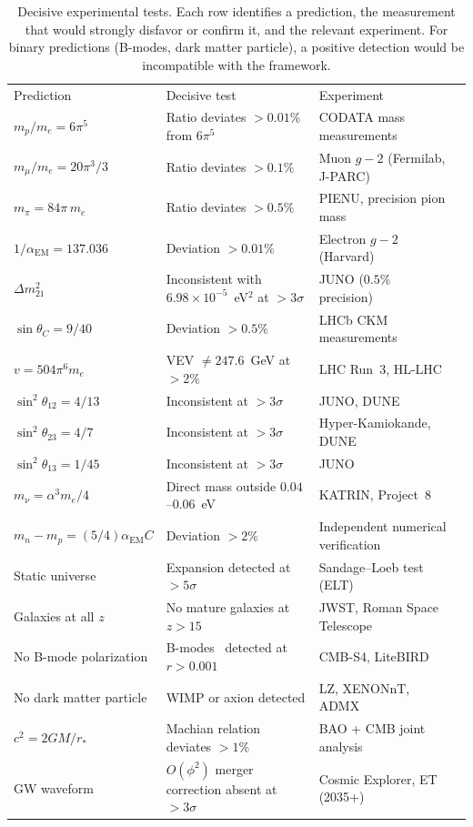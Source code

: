 \documentclass[aps,prd,twocolumn,superscriptaddress,nofootinbib,longbibliography]{revtex4-2}
\newcommand{\rstar}{r_{*}}
\newcommand{\aEM}{\alpha_{\mathrm{EM}}}
\begin{document}
\begin{table}[t]
\caption{\label{tab:falsify}%
Decisive experimental tests.  Each row identifies a prediction, the
measurement that would strongly disfavor or confirm it, and the
relevant experiment.  For binary predictions (B-modes, dark matter
particle), a positive detection would be incompatible with the
framework.}
\begin{ruledtabular}
\begin{tabular}{llll}
Prediction & Decisive test & Experiment \\
\colrule
$m_p/m_e = 6\pi^5$ & Ratio deviates $> 0.01\%$ from $6\pi^5$
  & CODATA mass measurements \\
$m_\mu/m_e = 20\pi^3/3$ & Ratio deviates $> 0.1\%$
  & Muon $g{-}2$ (Fermilab, J-PARC) \\
$m_\pi = 84\pi\,m_e$ & Ratio deviates $> 0.5\%$
  & PIENU, precision pion mass \\
$1/\aEM = 137.036$ & Deviation $> 0.01\%$
  & Electron $g{-}2$ (Harvard) \\
$\Delta m^2_{21}$ & Inconsistent with $6.98 \times 10^{-5}$~eV$^2$
  at $> 3\sigma$ & JUNO ($0.5\%$ precision) \\
$\sin\theta_C = 9/40$ & Deviation $> 0.5\%$
  & LHCb CKM measurements \\
$v = 504\pi^6 m_e$ & VEV $\neq 247.6$~GeV at $> 2\%$
  & LHC Run~3, HL-LHC \\
$\sin^2\theta_{12} = 4/13$ & Inconsistent at $> 3\sigma$
  & JUNO, DUNE \\
$\sin^2\theta_{23} = 4/7$ & Inconsistent at $> 3\sigma$
  & Hyper-Kamiokande, DUNE \\
$\sin^2\theta_{13} = 1/45$ & Inconsistent at $> 3\sigma$
  & JUNO \\
$m_\nu = \alpha^3 m_e/4$ & Direct mass outside
  $0.04$--$0.06$~eV & KATRIN, Project~8 \\
$m_n - m_p = (5/4)\aEM C$ & Deviation $> 2\%$
  & Independent numerical verification \\
Static universe & Expansion detected at $> 5\sigma$
  & Sandage--Loeb test (ELT) \\
Galaxies at all $z$ & No mature galaxies at $z > 15$
  & JWST, Roman Space Telescope \\
No B-mode polarization & B-modes~\cite{BICEP2021} detected at $r > 0.001$
  & CMB-S4, LiteBIRD \\
No dark matter particle & WIMP or axion detected
  & LZ, XENONnT, ADMX \\
$c^2 = 2GM/\rstar$ & Machian relation deviates $> 1\%$
  & BAO + CMB joint analysis \\
GW waveform & $O(\phi^2)$ merger correction absent
  at $> 3\sigma$ & Cosmic Explorer, ET (2035+) \\
\end{tabular}
\end{ruledtabular}
\end{table}
\end{document}
